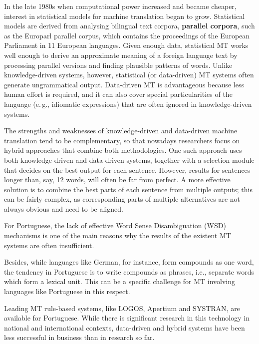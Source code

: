 \begin{multicols}{2}
In the late 1980s when computational power increased and became cheaper, interest in statistical models for machine translation began to grow. Statistical models are derived from analysing bilingual text corpora, \textbf{parallel corpora}, such as the Europarl parallel corpus, which contains the proceedings of the European Parliament in 11 European languages. Given enough data, statistical MT works well enough to derive an approximate meaning of a foreign language text by processing parallel versions and finding plausible patterns of words. Unlike knowledge-driven systems, however, statistical (or data-driven) MT systems often generate ungrammatical output. Data-driven MT is advantageous because less human effort is required, and it can also cover special particularities of the language (e.\,g., idiomatic expressions) that are often ignored in knowledge-driven systems. 

The strengths and weaknesses of knowledge-driven and data-driven machine translation tend to be complementary, so that nowadays researchers focus on hybrid approaches that combine both methodologies. One such approach uses both knowledge-driven and data-driven systems, together with a selection module that decides on the best output for each sentence. However, results for sentences longer than, say, 12 words, will often be far from perfect. A more effective solution is to combine the best parts of each sentence from multiple outputs; this can be fairly complex, as corresponding parts of multiple alternatives are not always obvious and need to be aligned. 


For Portuguese, the lack of effective Word Sense Disambiguation (WSD) mechanisms is one of the main reasons why the results of the existent MT systems are often insufficient. 

Besides, while languages like German, for instance, form compounds as one word, the tendency in Portuguese is to write compounds as phrases, i.e., separate words which form a lexical unit. This can be a specific challenge for MT involving languages like Portuguese in this respect.

Leading MT rule-based systems, like LOGOS, Apertium and SYSTRAN, are available for Portuguese. While there is significant research in this technology in national and international contexts, data-driven and hybrid systems have been less successful in business than in research so far. 


\end{multicols}
